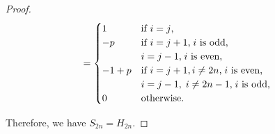 \documentclass[12pt, leqno]{amsart}
\numberwithin{equation}{section}
\theoremstyle{plain}
\theoremstyle{definition}
\newcommand{\0}{\mathbf{0}}
\begin{document}
\begin{proof}
\begin{align*}
&=\begin{cases}
1 &\text{if $i=j$,}\\
-p &\text{if $i=j+1$,\;$i$ is odd,}\\
	&\text{$i=j-1$,\;$i$ is even,}\\
-1+p &\text{if $i=j+1,i\neq 2n$,\;$i$ is even,}\\
	&\text{$i=j-1,\;i\neq 2n-1$,\;$i$ is odd,}\\
0 &\text{otherwise.}%
\end{cases}
\end{align*}
\normalsize

Therefore, we have $S_{2n}=H_{2n}$.
\end{proof}
\end{document}
